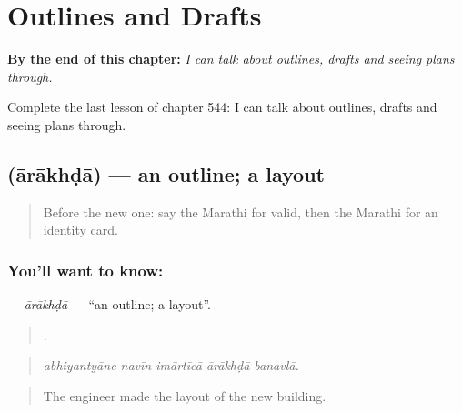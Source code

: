 
\chapter{Outlines and Drafts}
\label{ch:mr-outlines-and-drafts}

\begin{chapteropening}
\textbf{By the end of this chapter:} \emph{I can talk about outlines, drafts and seeing plans through.}

Complete the last lesson of chapter 544: I can talk about outlines, drafts and seeing plans through.
\end{chapteropening}

\section[\texorpdfstring{\mr{आराखडा} (ārākhḍā)}{आराखडा (ārākhḍā)}]{ (ārākhḍā) — an outline; a layout}

\label{lesson:MR-C544-arakhda}



\begin{quote}
Before the new one: say the Marathi for valid, then the Marathi for an identity card.
\end{quote}

\subsection*{You'll want to know: }
\textbf{} — \emph{ārākhḍā} — \textquotedblleft{}an outline; a layout\textquotedblright{}.

\begin{quote}
    .
\end{quote}

\begin{quote}
\emph{abhiyantyāne navīn imārtīcā ārākhḍā banavlā.}
\end{quote}

\begin{quote}
The engineer made the layout of the new building.
\end{quote}

